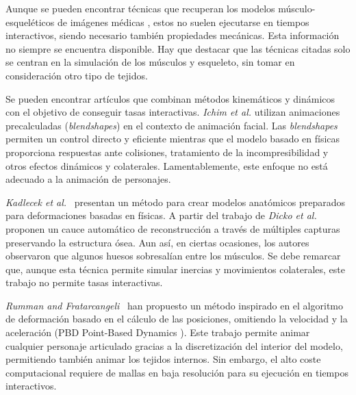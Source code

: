 Aunque se pueden encontrar técnicas que recuperan los modelos músculo-esqueléticos de imágenes médicas \cite{blemker2007, gilles2010, schmid2009}, estos no suelen ejecutarse en tiempos interactivos, siendo necesario también propiedades mecánicas. Esta información no siempre se encuentra disponible. Hay que destacar que las técnicas citadas solo se centran en la simulación de los músculos y esqueleto, sin tomar en consideración otro tipo de tejidos.

Se pueden encontrar artículos que combinan métodos kinemáticos y dinámicos con el objetivo de conseguir tasas interactivas.  \emph{Ichim et al.} \cite{Ichim:2016} utilizan animaciones precalculadas (\emph{blendshapes}) en el contexto de animación facial. Las \emph{blendshapes} permiten un control directo y eficiente mientras que el modelo basado en físicas proporciona respuestas ante colisiones, tratamiento de la incompresibilidad y otros efectos dinámicos y colaterales. Lamentablemente, este enfoque no está adecuado a la animación de personajes. 


\emph{Kadlecek et al.}~\cite{kadlecek-16-reconstructing} presentan un método para crear modelos anatómicos preparados para deformaciones basadas en físicas. A partir del trabajo de \emph{Dicko et al.}\cite{Ali2013} proponen un cauce automático de reconstrucción a través de múltiples capturas preservando la estructura ósea. Aun así, en ciertas ocasiones, los autores observaron que algunos huesos sobresalían entre los músculos. Se debe remarcar que, aunque esta técnica permite simular inercias y movimientos colaterales, este trabajo no permite tasas interactivas.   %

\emph{Rumman and Fratarcangeli}~\cite{abu2015position} han propuesto un método inspirado en el algoritmo de deformación basado en el cálculo de las posiciones, omitiendo la velocidad y la aceleración (PBD Point-Based Dynamics \cite{Bender:2014}). Este trabajo permite animar cualquier personaje articulado gracias a la discretización del interior del modelo, permitiendo también animar los tejidos internos. Sin embargo, el alto coste computacional requiere de mallas en baja resolución para su ejecución en tiempos interactivos.


